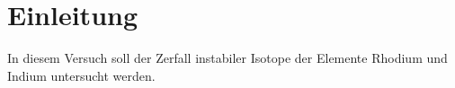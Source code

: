 
\section{Einleitung}
In diesem Versuch soll der Zerfall instabiler Isotope der Elemente Rhodium und Indium untersucht werden.